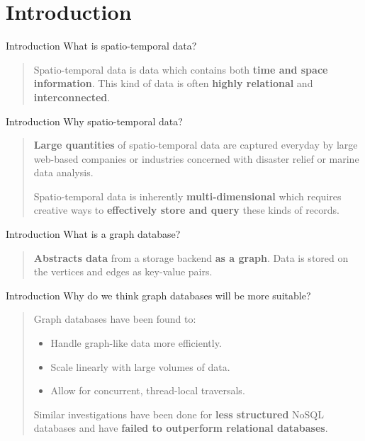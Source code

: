 \section{Introduction}

\begin{frame}{Introduction}
    What is spatio-temporal data?
    \vfill
    \begin{quote}
        Spatio-temporal data is data which contains both \textbf{time and space information}. This kind of data is often \textbf{highly relational} and \textbf{interconnected}.
    \end{quote}
    \vfill
\end{frame}

\begin{frame}{Introduction}
    Why spatio-temporal data?
    \vfill
    \begin{quote}
        \textbf{Large quantities} of spatio-temporal data are captured everyday by large web-based companies or industries concerned with disaster relief or marine data analysis.
        
        \medskip
        
        Spatio-temporal data is inherently \textbf{multi-dimensional} which requires creative ways to \textbf{effectively store and query} these kinds of records.
    \end{quote}
    \vfill
\end{frame}

\begin{frame}{Introduction}
    What is a graph database?
    \vfill
    \begin{quote}
        \textbf{Abstracts data} from a storage backend \textbf{as a graph}. Data is stored on the vertices and edges as key-value pairs.
    \end{quote}
    \vfill
\end{frame}

\begin{frame}{Introduction}
    Why do we think graph databases will be more suitable?
    \vfill
    \begin{quote}
    Graph databases have been found to:
    \medskip
        \begin{itemize}
            \item Handle graph-like data more efficiently.
            \item Scale linearly with large volumes of data.
            \item Allow for concurrent, thread-local traversals.
        \end{itemize}
    \medskip
    Similar investigations have been done for \textbf{less structured} NoSQL databases and have \textbf{failed to outperform relational databases}.
    \end{quote}
\end{frame}

